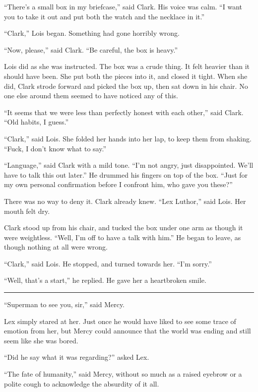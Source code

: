 \documentclass[ebook,12pt]{memoir}
\begin{document}
``There's a small box in my briefcase,'' said Clark. His voice was calm.
``I want you to take it out and put both the watch and the necklace in
it.''

``Clark,'' Lois began. Something had gone horribly wrong.

``Now, please,'' said Clark. ``Be careful, the box is heavy.''

Lois did as she was instructed. The box was a crude thing. It felt
heavier than it should have been. She put both the pieces into it, and
closed it tight. When she did, Clark strode forward and picked the box
up, then sat down in his chair. No one else around them seemed to have
noticed any of this.

``It seems that we were less than perfectly honest with each other,''
said Clark. ``Old habits, I guess.''

``Clark,'' said Lois. She folded her hands into her lap, to keep them
from shaking. ``Fuck, I don't know what to say.''

``Language,'' said Clark with a mild tone. ``I'm not angry, just
disappointed. We'll have to talk this out later.'' He drummed his
fingers on top of the box. ``Just for my own personal confirmation
before I confront him, who gave you these?''

There was no way to deny it. Clark already knew. ``Lex Luthor,'' said
Lois. Her mouth felt dry.

Clark stood up from his chair, and tucked the box under one arm as
though it were weightless. ``Well, I'm off to have a talk with him.'' He
began to leave, as though nothing at all were wrong.

``Clark,'' said Lois. He stopped, and turned towards her. ``I'm sorry.''

``Well, that's a start,'' he replied. He gave her a heartbroken smile.

\begin{center}\rule{0.5\linewidth}{0.5pt}\end{center}

``Superman to see you, sir,'' said Mercy.

Lex simply stared at her. Just once he would have liked to see some
trace of emotion from her, but Mercy could announce that the world was
ending and still seem like she was bored.

``Did he say what it was regarding?'' asked Lex.

``The fate of humanity,'' said Mercy, without so much as a raised
eyebrow or a polite cough to acknowledge the absurdity of it all.
\end{document}
